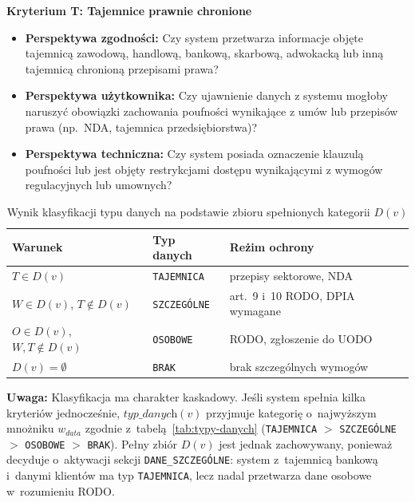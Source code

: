 \bigskip
\noindent\textbf{Kryterium T: Tajemnice prawnie chronione}
\begin{itemize}
    \item \textbf{Perspektywa zgodności:} Czy system przetwarza
    informacje objęte tajemnicą zawodową, handlową,
    bankową, skarbową, adwokacką lub inną tajemnicą
    chronioną przepisami prawa?
    \item \textbf{Perspektywa użytkownika:} Czy ujawnienie danych
    z systemu mogłoby naruszyć obowiązki zachowania
    poufności wynikające z umów lub przepisów prawa
    (np.\ NDA, tajemnica przedsiębiorstwa)?
    \item \textbf{Perspektywa techniczna:} Czy system posiada
    oznaczenie klauzulą poufności lub jest objęty
    restrykcjami dostępu wynikającymi z wymogów
    regulacyjnych lub umownych?
\end{itemize}

\begin{table}[H]
\centering
\caption{Wynik klasyfikacji typu danych na podstawie
         zbioru spełnionych kategorii $D(v)$}
\label{tab:wynik-typ-danych}
\renewcommand{\arraystretch}{1.3}
\begin{tabular}{p{5cm} p{4cm} p{4cm}}
\toprule
\textbf{Warunek} & \textbf{Typ danych} & \textbf{Reżim ochrony} \\
\midrule
$T \in D(v)$
    & \texttt{TAJEMNICA}
    & przepisy sektorowe, NDA \\
\midrule
$W \in D(v)$, $T \notin D(v)$
    & \texttt{SZCZEGÓLNE}
    & art.~9 i~10 RODO, DPIA wymagane \\
\midrule
$O \in D(v)$, $W, T \notin D(v)$
    & \texttt{OSOBOWE}
    & RODO, zgłoszenie do UODO \\
\midrule
$D(v) = \emptyset$
    & \texttt{BRAK}
    & brak szczególnych wymogów \\
\bottomrule
\end{tabular}
\end{table}

\noindent\textbf{Uwaga:} Klasyfikacja ma charakter kaskadowy.
Jeśli system spełnia kilka kryteriów jednocześnie,
$\textit{typ\_danych}(v)$ przyjmuje kategorię o~najwyższym
mnożniku $w_{data}$ zgodnie z~tabelą~\ref{tab:typy-danych}
(\texttt{TAJEMNICA} $>$ \texttt{SZCZEGÓLNE} $>$ \texttt{OSOBOWE} $>$ \texttt{BRAK}).
Pełny zbiór $D(v)$ jest jednak zachowywany, ponieważ decyduje
o~aktywacji sekcji \texttt{DANE\_SZCZEGÓLNE}: system z~tajemnicą
bankową i~danymi klientów ma typ \texttt{TAJEMNICA}, lecz
nadal przetwarza dane osobowe w~rozumieniu RODO.

